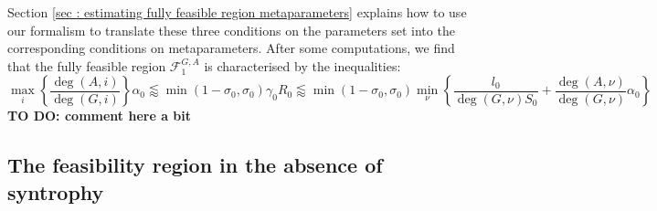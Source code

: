 \documentclass[12pt, titlepage]{report}
\begin{document}
Section \ref{sec : estimating fully feasible region metaparameters} explains how to use our formalism to translate these three conditions on the parameters set into the corresponding conditions on metaparameters. After some computations, we find that the fully feasible region $\mathcal{F}^{G,A}_1$ is characterised by the inequalities:
\begin{equation}
\boxed{
\max_i\left\{\frac{\deg(A,i)}{\deg(G,i)}\right\} \alpha_0
\lessapprox \min(1-\sigma_0, \sigma_0) \gamma_0 R_0
\lessapprox
\min \left(1-\sigma_0, \sigma_0 \right) \min_\nu \left\{ \frac{l_0}{\deg(G,\nu) S_0} + \frac{\deg(A,\nu)}{\deg(G,\nu)}\alpha_0\right\}
}\label{eq : fully feasible volume}
\end{equation}
\textbf{TO DO: comment here a bit}
\subsection{The feasibility region in the absence of syntrophy}\label{sec : feasibility without syntrophy}
\end{document}
